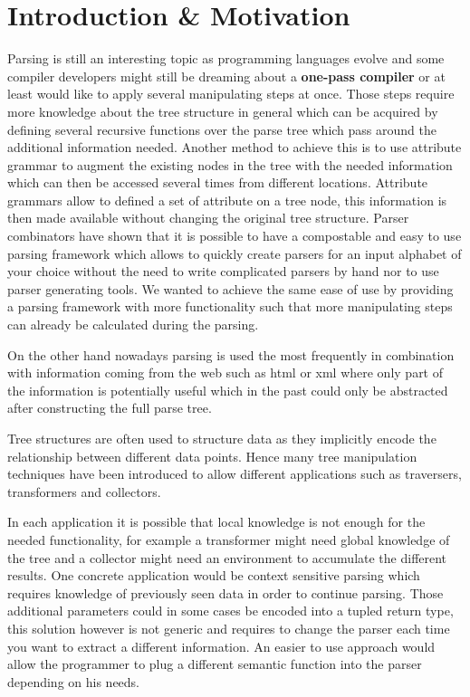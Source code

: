 \section{Introduction \& Motivation}
Parsing is still an interesting topic as programming languages evolve and some compiler developers might still be dreaming about a \textbf{one-pass compiler} or at least would like to apply several manipulating steps at once. Those steps require more knowledge about the tree structure in general which can be acquired by defining several recursive functions over the parse tree which pass around the additional information needed. Another method to achieve this is to use attribute grammar to augment the existing nodes in the tree with the needed information which can then be accessed several times from different locations. Attribute grammars allow to defined a set of attribute on a tree node, this information is then made available without changing the original tree structure.
Parser combinators have shown that it is possible to have a compostable and easy to use parsing framework which allows to quickly create parsers for an input alphabet of your choice without the need to write complicated parsers by hand nor to use parser generating tools. We wanted to achieve the same ease of use by providing a parsing framework with more functionality such that more manipulating steps can already be calculated during the parsing.

On the other hand nowadays parsing is used the most frequently in combination with information coming from the web such as html or xml where only part of the information is potentially useful which in the past could only be abstracted after constructing the full parse tree.

Tree structures are often used to structure data as they implicitly encode the relationship between different data points. Hence many tree manipulation techniques have been introduced to allow different applications such as traversers, transformers and collectors.

In each application it is possible that local knowledge is not enough for the needed functionality, for example a transformer might need global knowledge of the tree and a collector might need an environment to accumulate the different results. One concrete application would be context sensitive parsing which requires knowledge of previously seen data in order to continue parsing. Those additional parameters could in some cases be encoded into a tupled return type, this solution however is not generic and requires to change the parser each time you want to extract a different information. An easier to use approach would allow the programmer to plug a different semantic function into the parser depending on his needs.

